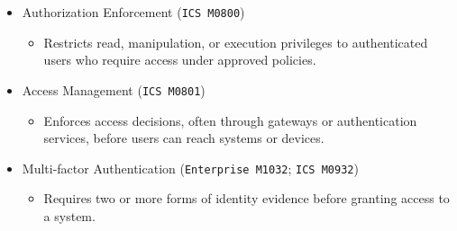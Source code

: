 \documentclass[10pt,a4paper,oneside]{report}
\begin{document}
\begin{itemize}
\begin{itemize}
\begin{itemize}
\end{itemize}
\item Authorization Enforcement (\texttt{ICS M0800})
\begin{itemize}
\item Restricts read, manipulation, or execution privileges to authenticated users who require access under approved policies.
\end{itemize}
\item Access Management (\texttt{ICS M0801})
\begin{itemize}
\item Enforces access decisions, often through gateways or authentication services, before users can reach systems or devices.
\end{itemize}
\item Multi-factor Authentication (\texttt{Enterprise M1032}; \texttt{ICS M0932})
\begin{itemize}
\item Requires two or more forms of identity evidence before granting access to a system.
\end{itemize}
\end{itemize}
\end{itemize}
\end{document}
